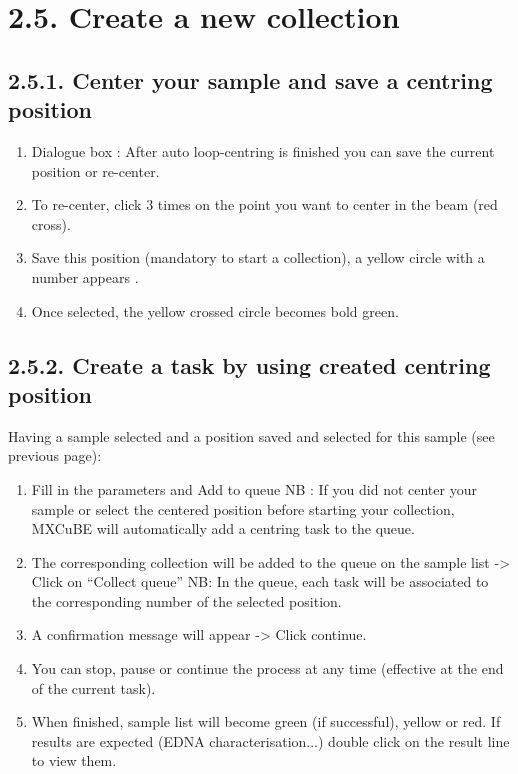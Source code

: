 \documentclass[a4paper,10pt,english]{sphinxmanual}
\begin{document}
\section{2.5. Create a new collection}
\label{user_manual:create-a-new-collection}

\subsection{2.5.1. Center your sample and save a centring position}
\label{user_manual:center-your-sample-and-save-a-centring-position}\begin{enumerate}
\item {} 
Dialogue box : After auto loop-centring is finished you can save the current position or re-center.

\item {} 
To re-center, click 3 times on the point you want to center in the beam (red cross).

\item {} 
Save this position (mandatory to start a collection), a yellow circle with a number appears .

\item {} 
Once selected, the yellow crossed circle becomes bold green.

\end{enumerate}


\subsection{2.5.2. Create a task by using created centring position}
\label{user_manual:create-a-task-by-using-created-centring-position}
Having a sample selected and a position saved and selected for this sample (see previous page):
\begin{enumerate}
\item {} 
Fill in the parameters and Add to queue NB : If you did not center your sample or select the centered position before starting your collection, MXCuBE will automatically add a centring task to the queue.

\item {} 
The corresponding collection will be added to the queue on the sample list -\textgreater{} Click on “Collect queue” NB: In the queue, each task will be associated to the corresponding number of the selected position.

\item {} 
A confirmation message will appear -\textgreater{} Click continue.

\item {} 
You can stop, pause or continue the process at any time (effective at the end of the current task).

\item {} 
When finished, sample list will become green (if successful), yellow or red. If results are expected (EDNA characterisation...) double click on the result line to view them.

\end{enumerate}
\end{document}
